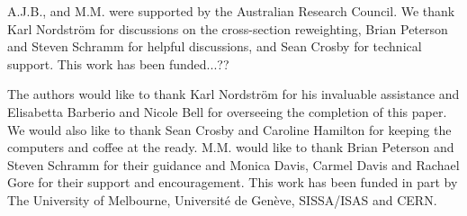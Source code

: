 A.J.B., and M.M. were supported by the Australian Research Council. We thank Karl Nordstr{\"o}m for discussions on the cross-section reweighting, Brian Peterson and Steven Schramm for helpful discussions, and Sean Crosby for technical support. This work has been funded...??

The authors would like to thank Karl Nordstr{\"o}m for his invaluable assistance and Elisabetta Barberio and Nicole Bell for overseeing the completion of this paper. We would also like to thank Sean Crosby and Caroline Hamilton for keeping the computers and coffee at the ready. M.M. would like to thank Brian Peterson and Steven Schramm for their guidance and Monica Davis, Carmel Davis and Rachael Gore for their support and encouragement. This work has been funded in part by The University of Melbourne, Universit\'{e} de Gen\`{e}ve, SISSA/ISAS and CERN.
